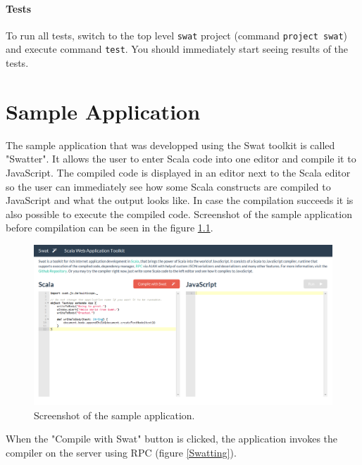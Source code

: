 \documentclass[12pt,a4paper]{report}
\begin{document}
\subsubsection*{Tests}

To run all tests, switch to the top level \texttt{swat} project (command \texttt{project swat}) and execute command \texttt{test}. You should immediately start seeing results of the tests.


\chapter{Sample Application}

The sample application that was developped using the Swat toolkit is called "Swatter". It allows the user to enter Scala code into one editor and compile it to JavaScript. The compiled code is displayed in an editor next to the Scala editor so the user can immediately see how some Scala constructs are compiled to JavaScript and what the output looks like. In case the compilation succeeds it is also possible to execute the compiled code. Screenshot of the sample application before compilation can be seen in the figure \ref{Swatter}.

\begin{figure}[ht]
  \centering
	\includegraphics[width=\linewidth,height=\textheight,keepaspectratio]{img/Swatter.png}
	\caption{Screenshot of the sample application.}
	\label{Swatter}
\end{figure}

When the "Compile with Swat" button is clicked, the application invokes the compiler on the server using RPC (figure \ref{Swatting}).
\end{document}
